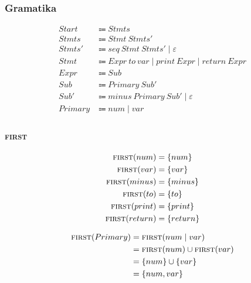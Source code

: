 \documentclass{report}
\newcommand{\Null}{\varepsilon}
\newcommand{\Spc}{\ }
\newcommand{\Union}{\mathrel{|}}
\newcommand{\FIRST}{\textsc{first}}
\newcommand{\Arrow}{\Coloneq}
\newcommand{\NT}[1]{{#1}}
\newcommand{\T}[1]{{#1}}
\begin{document}
\subsubsection*{Gramatika}
\begin{equation*}
  \begin{aligned}
    \NT{Start} &\Arrow \NT{Stmts}\\
    \NT{Stmts} &\Arrow \NT{Stmt} \Spc \NT{Stmts'}\\
    \NT{Stmts'} &\Arrow \T{seq} \Spc \NT{Stmt} \Spc \NT{Stmts'} \Union \Null\\
    \NT{Stmt} &\Arrow \NT{Expr} \Spc \T{to} \Spc \T{var} \Union \T{print} \Spc \NT{Expr} \Union \NT{return} \Spc \NT{Expr}\\
    \NT{Expr} &\Arrow \NT{Sub}\\
    \NT{Sub} &\Arrow \NT{Primary} \Spc \NT{Sub'}\\
    \NT{Sub'} &\Arrow \T{minus} \Spc \NT{Primary} \Spc \NT{Sub'} \Union \Null\\
    \NT{Primary} &\Arrow \T{num} \Union \T{var}
  \end{aligned}
\end{equation*}

\subsubsection*{{\FIRST}}
\begin{equation*}
  \begin{aligned}
    \FIRST(\T{num}) &= \{\T{num}\}\\
    \FIRST(\T{var}) &= \{\T{var}\}\\
    \FIRST(\T{minus}) &= \{\T{minus}\}\\
    \FIRST(\T{to}) &= \{\T{to}\}\\
    \FIRST(\T{print}) &= \{\T{print}\}\\
    \FIRST(\T{return}) &= \{\T{return}\}\\
  \end{aligned}
\end{equation*}

\begin{equation*}
  \begin{aligned}
    \FIRST(\NT{Primary}) &= \FIRST(\T{num} \Union \T{var})\\
    &= \FIRST(\T{num}) \cup \FIRST(\T{var})\\
    &= \{\T{num}\} \cup \{\T{var}\}\\
    &= \{\T{num}, \T{var}\}
  \end{aligned}
\end{equation*}
\end{document}
